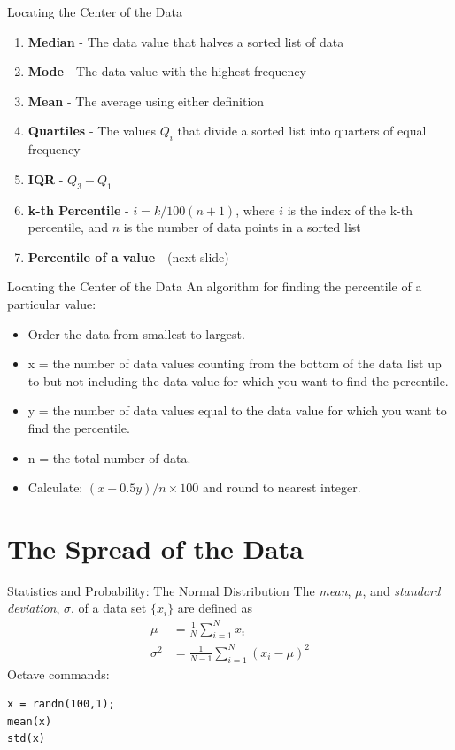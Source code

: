 \documentclass{beamer}
\begin{document}
\begin{frame}{Locating the Center of the Data}
\begin{enumerate}
\item \textbf{\alert{Median}} - The data value that halves a sorted list of data
\item \textbf{\alert{Mode}} - The data value with the highest frequency
\item \textbf{\alert{Mean}} - The average using either definition
\item \textbf{\alert{Quartiles}} - The values $Q_i$ that divide a sorted list into quarters of equal frequency
\item \textbf{\alert{IQR}} - $Q_3 - Q_1$
\item \textbf{\alert{k-th Percentile}} - $i = k/100 (n+1)$, where $i$ is the index of the k-th percentile, and $n$ is the number of data points in a sorted list
\item \textbf{\alert{Percentile of a value}} - (next slide)
\end{enumerate}
\end{frame}

\begin{frame}{Locating the Center of the Data}
An algorithm for finding the percentile of a particular value:
\begin{itemize}
\item Order the data from smallest to largest.
\item x = the number of data values counting from the bottom of the data list up to but not including the data value for which
you want to find the percentile.
\item y = the number of data values equal to the data value for which you want to find the percentile.
\item n = the total number of data.
\item Calculate: $(x+0.5y)/n \times 100$ and round to nearest integer.
\end{itemize}
\end{frame}

\section{The Spread of the Data}

\begin{frame}[fragile]{Statistics and Probability: The Normal Distribution}
The \textit{mean}, $\mu$, and \textit{standard deviation}, $\sigma$, of a data set $\lbrace x_i \rbrace$ are defined as
\begin{align}
\mu &= \frac{1}{N}\sum_{i=1}^N x_i \\
\sigma^2 &= \frac{1}{N-1}\sum_{i=1}^N\left(x_i-\mu\right)^2
\end{align}
Octave commands:
\begin{verbatim}
x = randn(100,1);
mean(x)
std(x)
\end{verbatim}
\end{frame}
\end{document}
